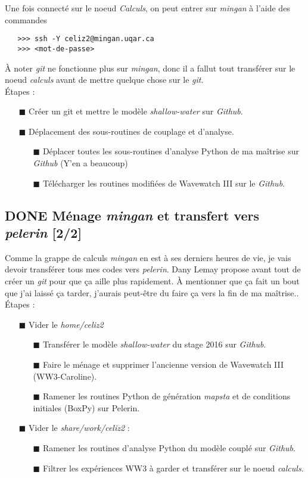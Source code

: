 \documentclass[10pt]{report}
\numberwithin{equation}{section}
\renewcommand{\boxtimes}{\blacksquare}
\begin{document}
Une fois connecté sur le noeud \emph{Calculs}, on peut entrer sur \emph{mingan} à l'aide des commandes
\begin{verbatim}
   >>> ssh -Y celiz2@mingan.uqar.ca
   >>> <mot-de-passe>
\end{verbatim}
À noter \emph{git} ne fonctionne plus sur \emph{mingan}, donc il a fallut tout transférer sur le noeud \emph{calculs} avant de mettre quelque chose sur le \emph{git}.\\[0pt]

Étapes : 
\begin{itemize}
\item[{$\boxtimes$}] Créer un git et mettre le modèle \emph{shallow-water} sur \emph{Github}.
\item[{$\boxtimes$}] Déplacement des sous-routines de couplage et d'analyse.
\begin{itemize}
\item[{$\boxtimes$}] Déplacer toutes les sous-routines d'analyse Python de ma maîtrise sur \emph{Github} (Y'en a beaucoup)
\item[{$\boxtimes$}] Télécharger les routines modifiées de Wavewatch III sur le \emph{Github}.
\end{itemize}
\end{itemize}

\subsection{{\bfseries\sffamily DONE} Ménage \emph{mingan} et transfert vers \emph{pelerin} [2/2]}
\label{sec:org38c3a25}
Comme la grappe de calculs \emph{mingan} en est à ses derniers heures de vie, je vais devoir transférer tous mes codes vers \emph{pelerin}.
Dany Lemay propose avant tout de créer un \emph{git} pour que ça aille plus rapidement.
À mentionner que ça fait un bout que j'ai laissé ça tarder, j'aurais peut-être du faire ça vers la fin de ma maîtrise..\\[0pt]

Étapes : 
\begin{itemize}
\item[{$\boxtimes$}] Vider le \emph{home/celiz2}
\begin{itemize}
\item[{$\boxtimes$}] Transférer le modèle \emph{shallow-water} du stage 2016 sur \emph{Github}.
\item[{$\boxtimes$}] Faire le ménage et supprimer l'ancienne version de Wavewatch III (WW3-Caroline).
\item[{$\boxtimes$}] Ramener les routines Python de génération \emph{mapsta} et de conditions initiales (BoxPy) sur Pelerin.
\end{itemize}
\item[{$\boxtimes$}] Vider le \emph{share/work/celiz2} :
\begin{itemize}
\item[{$\boxtimes$}] Ramener les routines d'analyse Python du modèle couplé sur \emph{Github}.
\item[{$\boxtimes$}] Filtrer les expériences WW3 à garder et transférer sur le noeud \emph{calculs}.
\end{itemize}
\end{itemize}
\end{document}
